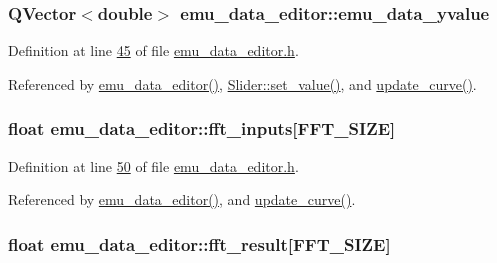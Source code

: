 \hypertarget{a00004_ad922d05d1e988d84f404c115fe909f72}{
\subsubsection[{emu\+\_\+data\+\_\+yvalue}]{\setlength{\rightskip}{0pt plus 5cm}Q\+Vector$<$double$>$ emu\+\_\+data\+\_\+editor\+::emu\+\_\+data\+\_\+yvalue}}\label{a00004_ad922d05d1e988d84f404c115fe909f72}


Definition at line \hyperlink{a00036_source_l00045}{45} of file \hyperlink{a00036_source}{emu\+\_\+data\+\_\+editor.\+h}.



Referenced by \hyperlink{a00035_source_l00012}{emu\+\_\+data\+\_\+editor()}, \hyperlink{a00046_source_l00102}{Slider\+::set\+\_\+value()}, and \hyperlink{a00035_source_l00284}{update\+\_\+curve()}.

\hypertarget{a00004_a8782fc20094d65d56c04869b9692902e}{
\subsubsection[{fft\+\_\+inputs}]{\setlength{\rightskip}{0pt plus 5cm}float emu\+\_\+data\+\_\+editor\+::fft\+\_\+inputs\mbox{[}{\bf F\+F\+T\+\_\+\+S\+I\+Z\+E}\mbox{]}}}\label{a00004_a8782fc20094d65d56c04869b9692902e}


Definition at line \hyperlink{a00036_source_l00050}{50} of file \hyperlink{a00036_source}{emu\+\_\+data\+\_\+editor.\+h}.



Referenced by \hyperlink{a00035_source_l00012}{emu\+\_\+data\+\_\+editor()}, and \hyperlink{a00035_source_l00284}{update\+\_\+curve()}.

\hypertarget{a00004_a63b6150bfbba86ba943877a2f547ddd8}{
\subsubsection[{fft\+\_\+result}]{\setlength{\rightskip}{0pt plus 5cm}float emu\+\_\+data\+\_\+editor\+::fft\+\_\+result\mbox{[}{\bf F\+F\+T\+\_\+\+S\+I\+Z\+E}\mbox{]}}}\label{a00004_a63b6150bfbba86ba943877a2f547ddd8}


